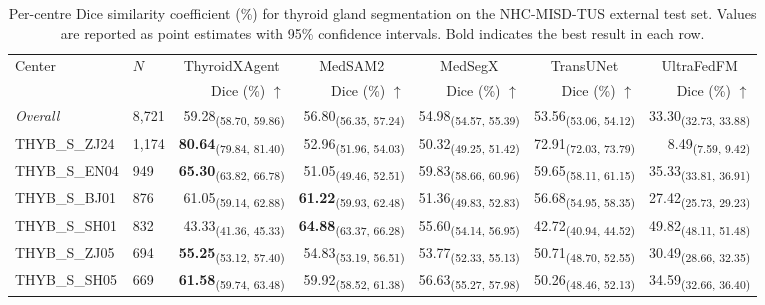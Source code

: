 \begin{table}[p]
\centering
\caption{Per-centre Dice similarity coefficient (\%) for thyroid gland segmentation on the NHC-MISD-TUS external test set. Values are reported as point estimates with 95\% confidence intervals. Bold indicates the best result in each row.}
\label{tab:gland_dice}
\footnotesize
\setlength{\tabcolsep}{4pt}
\begin{tabular}{llrrrrr}
\toprule
\multirow{2}{*}{Center} & \multirow{2}{*}{$N$} & \multicolumn{1}{c}{ThyroidXAgent} & \multicolumn{1}{c}{MedSAM2} & \multicolumn{1}{c}{MedSegX} & \multicolumn{1}{c}{TransUNet} & \multicolumn{1}{c}{UltraFedFM} \\
\cmidrule(lr){3-3} \cmidrule(lr){4-4} \cmidrule(lr){5-5} \cmidrule(lr){6-6} \cmidrule(lr){7-7}
 & & Dice (\%) $\uparrow$ & Dice (\%) $\uparrow$ & Dice (\%) $\uparrow$ & Dice (\%) $\uparrow$ & Dice (\%) $\uparrow$ \\
\midrule
\textit{Overall} & 8,721 & 59.28\textsubscript{(58.70, 59.86)} & 56.80\textsubscript{(56.35, 57.24)} & 54.98\textsubscript{(54.57, 55.39)} & 53.56\textsubscript{(53.06, 54.12)} & 33.30\textsubscript{(32.73, 33.88)} \\
\midrule
THYB\_S\_ZJ24 & 1,174 & \textbf{80.64}\textsubscript{(79.84, 81.40)} & 52.96\textsubscript{(51.96, 54.03)} & 50.32\textsubscript{(49.25, 51.42)} & 72.91\textsubscript{(72.03, 73.79)} & 8.49\textsubscript{(7.59, 9.42)} \\
THYB\_S\_EN04 & 949 & \textbf{65.30}\textsubscript{(63.82, 66.78)} & 51.05\textsubscript{(49.46, 52.51)} & 59.83\textsubscript{(58.66, 60.96)} & 59.65\textsubscript{(58.11, 61.15)} & 35.33\textsubscript{(33.81, 36.91)} \\
THYB\_S\_BJ01 & 876 & 61.05\textsubscript{(59.14, 62.88)} & \textbf{61.22}\textsubscript{(59.93, 62.48)} & 51.36\textsubscript{(49.83, 52.83)} & 56.68\textsubscript{(54.95, 58.35)} & 27.42\textsubscript{(25.73, 29.23)} \\
THYB\_S\_SH01 & 832 & 43.33\textsubscript{(41.36, 45.33)} & \textbf{64.88}\textsubscript{(63.37, 66.28)} & 55.60\textsubscript{(54.14, 56.95)} & 42.72\textsubscript{(40.94, 44.52)} & 49.82\textsubscript{(48.11, 51.48)} \\
THYB\_S\_ZJ05 & 694 & \textbf{55.25}\textsubscript{(53.12, 57.40)} & 54.83\textsubscript{(53.19, 56.51)} & 53.77\textsubscript{(52.33, 55.13)} & 50.71\textsubscript{(48.70, 52.55)} & 30.49\textsubscript{(28.66, 32.35)} \\
THYB\_S\_SH05 & 669 & \textbf{61.58}\textsubscript{(59.74, 63.48)} & 59.92\textsubscript{(58.52, 61.38)} & 56.63\textsubscript{(55.27, 57.98)} & 50.26\textsubscript{(48.46, 52.13)} & 34.59\textsubscript{(32.66, 36.40)} \\

\end{tabular}
\end{table}
